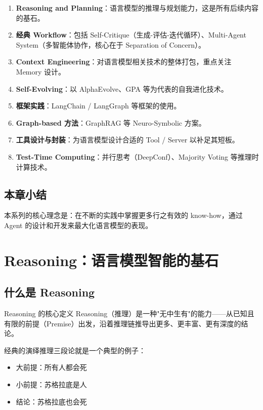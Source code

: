 \documentclass[a4paper]{article}
\begin{document}
\begin{enumerate}
    \item \textbf{Reasoning and Planning}：语言模型的推理与规划能力，这是所有后续内容的基石。
    \item \textbf{经典 Workflow}：包括 Self-Critique（生成-评估-迭代循环）、Multi-Agent System（多智能体协作，核心在于 Separation of Concern）。
    \item \textbf{Context Engineering}：对语言模型相关技术的整体打包，重点关注 Memory 设计。
    \item \textbf{Self-Evolving}：以 AlphaEvolve、GPA 等为代表的自我进化技术。
    \item \textbf{框架实践}：LangChain / LangGraph 等框架的使用。
    \item \textbf{Graph-based 方法}：GraphRAG 等 Neuro-Symbolic 方案。
    \item \textbf{工具设计与封装}：为语言模型设计合适的 Tool / Server 以补足其短板。
    \item \textbf{Test-Time Computing}：并行思考（DeepConf）、Majority Voting 等推理时计算技术。
\end{enumerate}

\subsection{本章小结}

本系列的核心理念是：在不断的实践中掌握更多行之有效的 know-how，通过 Agent 的设计和开发来最大化语言模型的表现。


\section{Reasoning：语言模型智能的基石}

\subsection{什么是 Reasoning}

\begin{importantbox}{Reasoning 的核心定义}
Reasoning（推理）是一种"无中生有"的能力——从已知且有限的前提（Premise）出发，沿着推理链推导出更多、更丰富、更有深度的结论。
\end{importantbox}

经典的演绎推理三段论就是一个典型的例子：
\begin{itemize}
    \item 大前提：所有人都会死
    \item 小前提：苏格拉底是人
    \item 结论：苏格拉底也会死
\end{itemize}
\end{document}
